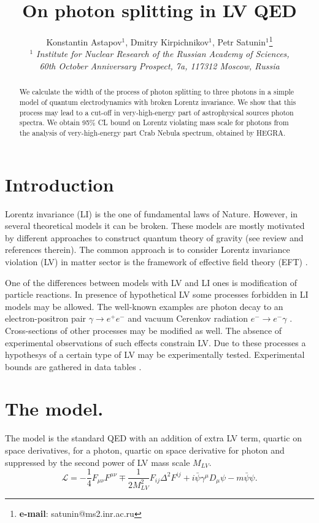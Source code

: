 \documentclass[12pt]{article}
\title{On photon splitting in LV QED}
\author{Konstantin Astapov$^1$, Dmitry Kirpichnikov$^1$,  Petr Satunin$^1$\thanks{{\bf e-mail}: satunin@ms2.inr.ac.ru}
\vspace{.2cm}\\
\normalsize\it $^1$ Institute for Nuclear Research of the Russian Academy
of Sciences, \\  
\normalsize \it  60th October Anniversary Prospect, 7a, 117312  Moscow, Russia}
\begin{document}
\maketitle

\begin{abstract}
We calculate the width of the process of photon splitting to three photons in a simple model of quantum electrodynamics with broken Lorentz invariance. We show that this process may lead to a cut-off in very-high-energy part of astrophysical sources photon spectra. We obtain 95\% CL bound on Lorentz violating mass scale for photons from the analysis of very-high-energy part Crab Nebula spectrum, obtained by HEGRA. 
\end{abstract}

\section{Introduction}
\label{intro}

Lorentz invariance (LI) is the one of fundamental laws of Nature. However, in several theoretical models it can be broken. These models are mostly motivated by different approaches to construct quantum theory of gravity (see review \cite{Liberati:2013xla} and references therein). The common approach is to consider Lorentz invariance violation (LV) in matter sector is the framework of effective field theory (EFT) \cite{Colladay:1998fq}.  

One of the differences between models with LV and LI ones is modification of particle reactions. In presence of hypothetical LV some processes forbidden in LI models may be allowed. The well-known examples are photon decay to an electron-positron pair $\gamma \to e^+e^-$ and vacuum Cerenkov radiation $e^-\to e^-\gamma$ \cite{Coleman:1997xq}. Cross-sections of other processes may be modified as well. The absence of experimental observations of such effects constrain LV. Due to these processes a hypothesys of a certain type of LV may be experimentally tested. Experimental bounds are gathered in data tables \cite{Kostelecky:2008ts}.

\section{The model.}

The model is the standard QED with an addition of extra LV term, quartic on space derivatives, for a photon, quartic on space derivative for photon and suppressed by the second power of LV mass scale $M_{LV}$.
\begin{equation}\label{L1}
\mathcal{L}=-\frac{1}{4}F_{\mu\nu}F^{\mu\nu}  \mp \frac{1}{2 M_{LV}^2}F_{ij}\Delta^2 F^{ij}  +i\bar{\psi}\gamma^\mu D_\mu\psi - m\bar{\psi}\psi . 
\end{equation}
\end{document}
